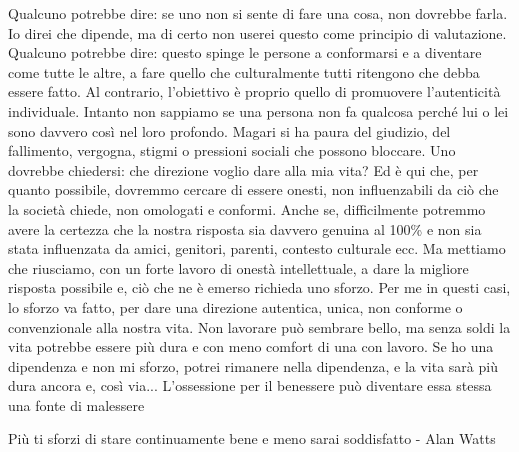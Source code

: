 \documentclass[12pt]{book} %
\begin{document}
Qualcuno potrebbe dire: se uno non si sente di fare una cosa, non dovrebbe farla.
Io direi che dipende, ma di certo non userei questo come principio di valutazione.
Qualcuno potrebbe dire: questo spinge le persone a conformarsi e a diventare come tutte le altre, a fare quello che culturalmente tutti ritengono che debba essere fatto. Al contrario, l'obiettivo è proprio quello di promuovere l'autenticità individuale.
Intanto non sappiamo se una persona non fa qualcosa perché lui o lei sono davvero così nel loro profondo. Magari si ha paura del giudizio, del fallimento, vergogna, stigmi o pressioni sociali che possono bloccare.
Uno dovrebbe chiedersi: che direzione voglio dare alla mia vita? Ed è qui che, per quanto possibile, dovremmo cercare di essere onesti, non influenzabili da ciò che la società chiede, non omologati e conformi. Anche se, difficilmente potremmo avere la certezza che la nostra risposta sia davvero genuina al 100\% e non sia stata influenzata da amici, genitori, parenti, contesto culturale ecc. Ma mettiamo che riusciamo, con un forte lavoro di onestà intellettuale, a dare la migliore risposta possibile e, ciò che ne è emerso richieda uno sforzo. Per me in questi casi, lo sforzo va fatto, per dare una direzione autentica, unica, non conforme o convenzionale alla nostra vita. 
Non lavorare può sembrare bello, ma senza soldi la vita potrebbe essere più dura e con meno comfort di una con lavoro. Se ho una dipendenza e non mi sforzo, potrei rimanere nella dipendenza, e la vita sarà più dura ancora e, così via...
L’ossessione per il benessere può diventare essa stessa una fonte di malessere

Più ti sforzi di stare continuamente bene e meno sarai soddisfatto - Alan Watts
\end{document}
